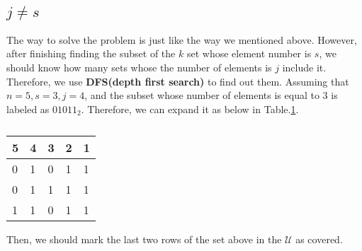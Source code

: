 \subsection{$j \neq s$}
    The way to solve the problem is just like the way we mentioned above. However, after finishing finding the subset of the $k$ set whose element number is $s$, we should know how many sets 
    whose the number of elements is $j$ include it. Therefore, we use \textbf{DFS(depth first search)} to find out them.
    Assuming that $n=5, s=3, j=4$, and the subset whose number of elements is equal to 3 is labeled as $01011_2$. Therefore, we can expand it as below in Table.\ref{tab:j neq s}.
    \begin{table}[!hpbt]
        \centering
        \begin{tabular}{lllll}
        \hline
        \multicolumn{1}{|l|}{5} & \multicolumn{1}{l|}{4} & \multicolumn{1}{l|}{3} & \multicolumn{1}{l|}{2} & \multicolumn{1}{l|}{1} \\ \hline
        0                       & 1                      & 0                      & 1                      & 1                      \\
        0                       & 1                      & 1                      & 1                      & 1                      \\
        1                       & 1                      & 0                      & 1                      & 1                     
        \end{tabular}
        \caption{}
        \label{tab:j neq s}
    \end{table}
    
    Then, we should mark the last two rows of the set above in the $\mathcal{U}$ as covered.